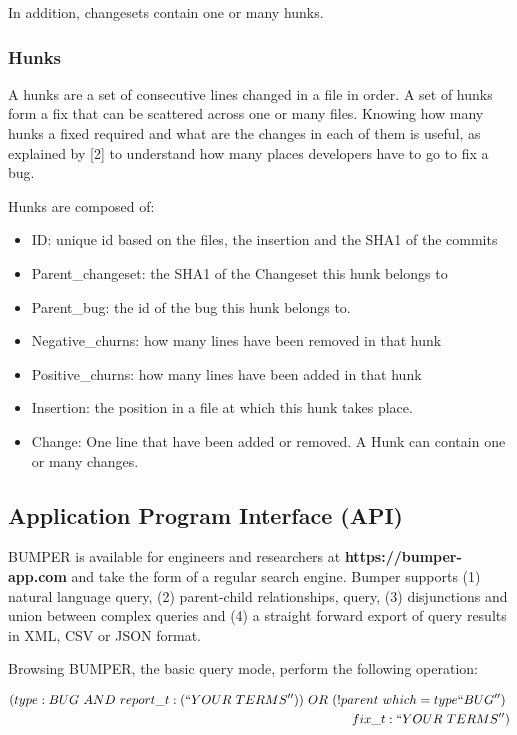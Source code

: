 In addition, changesets contain one or many hunks.

\subsubsection{Hunks}
A hunks are a set of consecutive lines changed in a file in order. A set of hunks form a fix that can be scattered across one or many files. Knowing how many hunks a fixed required and what are the changes in each of them is useful, as explained by [2] to understand how many places developers have to go to fix a bug.

Hunks are composed of:

\begin{itemize}
\item ID: unique id based on the files, the insertion and the SHA1 of the commits
\item Parent\_changeset: the SHA1 of the Changeset this hunk belongs to
\item Parent\_bug: the id of the bug this hunk belongs to.
\item Negative\_churns: how many lines have been removed in that hunk
\item Positive\_churns: how many lines have been added in that hunk
\item Insertion: the position in a file at which this hunk takes place.
\item Change: One line that have been added or removed. A Hunk can contain one or many changes.
\end{itemize}

\subsection{Application Program Interface (API)\label{sec:bumper-api}}

BUMPER is available for engineers and researchers at {\bf https://bumper-app.com} and take the form of a regular search engine. Bumper supports (1) natural language query, (2) parent-child relationships, query, (3) disjunctions and union between complex queries and (4) a straight forward export of query results in XML, CSV or JSON format.

Browsing BUMPER, the basic query mode, perform the following operation:

\begin{equation}
\begin{split}
(type:BUG~AND~report\_t:(``YOUR~TERMS''))~OR~(!parent~which=type``BUG'')~\\fix\_t:``YOUR~TERMS'')
\end{split}
\end{equation}

